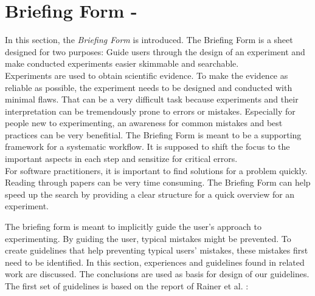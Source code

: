 

\section{Briefing Form - \briefingform}
\label{sec:briefing form}

In this section, the \textit{Briefing Form} is introduced. The Briefing Form is a sheet designed for two purposes: Guide users through the design of an experiment and make conducted experiments easier skimmable and searchable.\\
Experiments are used to obtain scientific evidence. To make the evidence as reliable as possible, the experiment needs to be designed and conducted with minimal flaws. That can be a very difficult task because experiments and their interpretation can be tremendously prone to errors or mistakes. Especially for people new to experimenting, an awareness for common mistakes and best practices can be very benefitial.
The Briefing Form is meant to be a  supporting framework for a systematic workflow. It is supposed to shift the focus to the important aspects in each step and sensitize for critical errors.\\
For software practitioners, it is important to find solutions for a problem quickly. Reading through papers can be very time consuming. The Briefing Form can help speed up the search by providing a clear structure for a quick overview for an experiment.

The briefing form is meant to implicitly guide the user's approach to experimenting.
By guiding the user, typical mistakes might be prevented.
To create guidelines that help preventing typical users' mistakes, these mistakes first need to be identified.
In this section, experiences and guidelines found in related work are discussed.
The conclusions are used as basis for design of our guidelines.
The first set of guidelines is based on the report of Rainer et al. \cite{Rainer2006}: